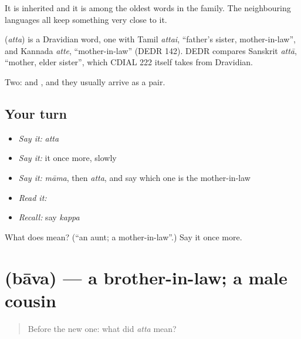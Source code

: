 It is inherited and it is among the oldest words in the family. The neighbouring languages all keep something very close to it.

\begin{cousinweb}
\textbf{} (\emph{atta}) is a Dravidian word, one with Tamil \emph{attai}, \textquotedblleft{}father's sister, mother-in-law\textquotedblright{}, and Kannada \emph{atte}, \textquotedblleft{}mother-in-law\textquotedblright{} (DEDR 142). DEDR compares Sanskrit \emph{attā}, \textquotedblleft{}mother, elder sister\textquotedblright{}, which CDIAL 222 itself takes from Dravidian.
\end{cousinweb}

\begin{grammarlens}[title={What you've built}]
Two:  and , and they usually arrive as a pair.
\end{grammarlens}

\subsection*{Your turn}
\begin{itemize}
\raggedright
  \item \emph{Say it:} \emph{atta}
  \item \emph{Say it:} it once more, slowly
  \item \emph{Say it:} \emph{māma}, then \emph{atta}, and say which one is the mother-in-law
  \item \emph{Read it:} \textbf{}
  \item \emph{Recall:} say \emph{kappa}
\end{itemize}

\begin{tcolorbox}[breakable,colback=teal!4,colframe=teal!35!black,title={Before you move on}]
What does  mean? (\textquotedblleft{}an aunt; a mother-in-law\textquotedblright{}.) Say it once more.
\end{tcolorbox}
\section[\texorpdfstring{\te{బావ} (bāva)}{బావ (bāva)}]{ (bāva) — a brother-in-law; a male cousin}

\label{lesson:TE-C71-brother-in-law}



\begin{quote}
Before the new one: what did \emph{atta} mean?
\end{quote}

